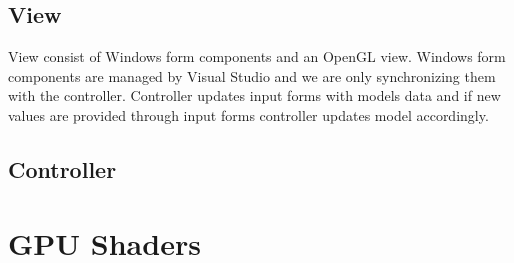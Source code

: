 \subsection{View}

View consist of Windows form components and an OpenGL view.
Windows form components are managed by Visual Studio and we are only synchronizing them with the controller.
Controller updates input forms with models data and if new values are provided through input forms controller updates model accordingly.


\subsection{Controller}

\section{GPU Shaders}